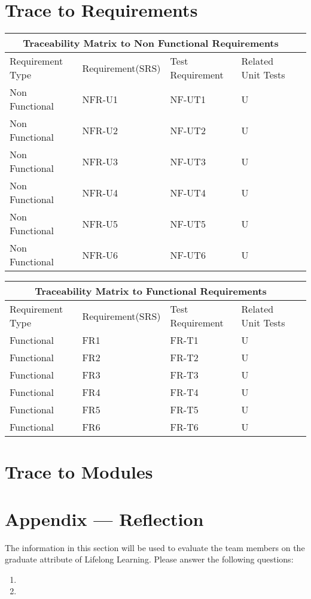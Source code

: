 \documentclass[12pt, titlepage]{article}
\begin{document}
\section{Trace to Requirements}
\begin{tabular}{ |p{3cm}||p{4cm}|p{4cm}|p{4cm}|p{4cm}| }
  \hline
  \multicolumn{4}{|c|}{Traceability Matrix to Non Functional Requirements} \\
  \hline
  Requirement Type & Requirement(SRS) & Test Requirement & Related Unit Tests \\
  \hline
  Non Functional   & NFR-U1  & NF-UT1 & U \\ \hline
  Non Functional   & NFR-U2  & NF-UT2 & U \\ \hline
  Non Functional   & NFR-U3  & NF-UT3 & U \\ \hline
  Non Functional   & NFR-U4  & NF-UT4 & U \\ \hline
  Non Functional   & NFR-U5  & NF-UT5 & U \\ \hline
  Non Functional   & NFR-U6  & NF-UT6 & U \\ \hline
  
 \end{tabular}

 \begin{tabular}{ |p{3cm}||p{4cm}|p{4cm}|p{4cm}|p{4cm}| }
  \hline
  \multicolumn{4}{|c|}{Traceability Matrix to Functional Requirements} \\
  \hline
  Requirement Type & Requirement(SRS) & Test Requirement & Related Unit Tests \\
  \hline
  Functional   & FR1  & FR-T1 & U \\ \hline
  Functional   & FR2  & FR-T2 & U \\ \hline
  Functional   & FR3  & FR-T3 & U \\ \hline
  Functional   & FR4  & FR-T4 & U \\ \hline
  Functional   & FR5  & FR-T5 & U \\ \hline
  Functional   & FR6  & FR-T6 & U \\ \hline
  
 \end{tabular}
		
\section{Trace to Modules}		




\newpage{}
\section*{Appendix --- Reflection}

The information in this section will be used to evaluate the team members on the
graduate attribute of Lifelong Learning.  Please answer the following questions:

\begin{enumerate}
  \item 
  \item 
\end{enumerate}
\end{document}
